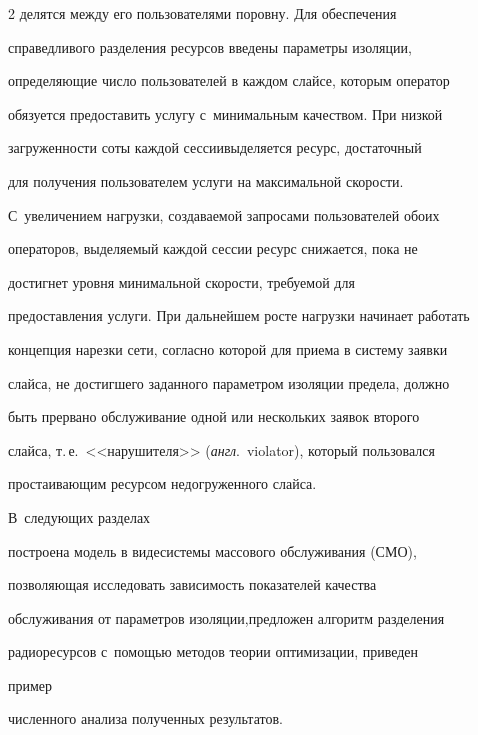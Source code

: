 \begin{multicols}{2}
делятся между его пользователями поровну. Для обеспечения 


справедливого разделения ресурсов введены параметры изоляции, 


определяющие чис\-ло пользователей в каждом слайсе, которым оператор 


обязуется предоставить услугу с~минимальным качеством. При низ\-кой 


за\-гру\-жен\-ности соты каждой сессии\linebreak выделяется ресурс, достаточный 


для получения пользователем услуги на максимальной ско\-рости. 


С~увеличением нагрузки, создаваемой запросами пользователей обоих 


операторов, вы\-де\-ля\-емый каж\-дой сессии ресурс снижается, пока не 


достигнет уровня минимальной ско\-рости, тре\-бу\-емой для 


предоставления услуги. При дальнейшем росте нагрузки начинает работать 


концепция нарезки сети, согласно которой для приема в сис\-те\-му заявки 


слайса, не достигшего заданного па\-ра\-мет\-ром изоляции предела, долж\-но 


быть прервано обслуживание одной или нескольких заявок второго 


слайса, т.\,е.\ <<нарушителя>> (\textit{англ}.\ violator), который пользовался 


простаивающим ресурсом недогруженного слайса. 





В~сле\-ду\-ющих разделах 


построена модель в виде\linebreak сис\-те\-мы массового обслуживания (СМО), 


позво\-ля\-ющая исследовать за\-ви\-си\-мость показателей качества 


обслуживания от параметров изоляции,\linebreak предложен алгоритм разделения 


радиоресурсов с~по\-мощью методов теории оптимизации, приведен 


пример  


чис\-лен\-но\-го анализа полученных результатов.


  



\end{multicols}
